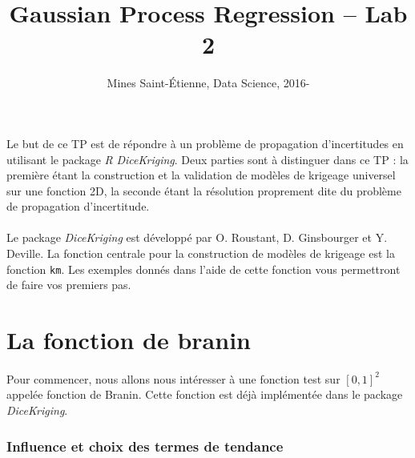 \documentclass[11pt]{scrartcl}
\title{\vspace{-1cm}Gaussian Process Regression -- Lab 2}
\author{Mines Saint-\'Etienne, Data Science,  2016\:-\:2017 }
\date{}
\begin{document}
\maketitle

\paragraph{}
Le but de ce TP est de répondre à un problème de propagation d'incertitudes en utilisant le package \emph{R} \emph{DiceKriging}. Deux parties sont à distinguer dans ce TP : la première étant la construction et la validation de modèles de krigeage universel sur une fonction 2D, la seconde étant la résolution proprement dite du problème de propagation d'incertitude.

\paragraph{}
Le package \emph{DiceKriging} est développé par O. Roustant, D. Ginsbourger et Y. Deville. La fonction centrale pour la construction de modèles de krigeage est la fonction \texttt{km}. Les exemples donnés dans l'aide de cette fonction vous permettront de faire vos premiers pas. 

\section*{La fonction de branin}

\paragraph{}
Pour commencer, nous allons nous intéresser à une fonction test sur $[0,1]^2$ appelée fonction de Branin. Cette fonction est déjà implémentée  dans le package \emph{DiceKriging}. %

\subsubsection*{Influence et choix des termes de tendance}
\end{document}
